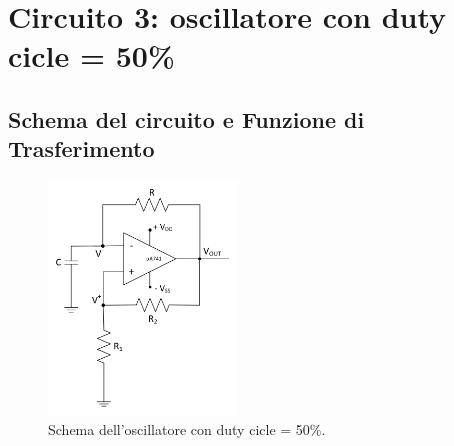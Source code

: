 \documentclass{report}
\begin{document}
\newpage
\section{Circuito 3: oscillatore con duty cicle = 50\%}
\subsection{Schema del circuito e Funzione di Trasferimento}
\begin{figure}[h]
	\centering
	\includegraphics[height=6.2cm]{immagini/schema3}
	\caption{Schema dell'oscillatore con duty cicle = 50\%.}
	\label{figura:schema3}
\end{figure}
\end{document}

